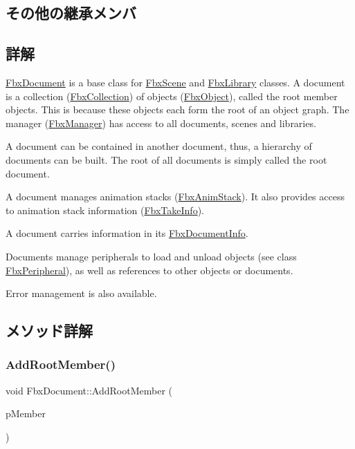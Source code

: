 \subsection*{その他の継承メンバ}


\subsection{詳解}
\hyperlink{class_fbx_document}{Fbx\+Document} is a base class for \hyperlink{class_fbx_scene}{Fbx\+Scene} and \hyperlink{class_fbx_library}{Fbx\+Library} classes. A document is a collection (\hyperlink{class_fbx_collection}{Fbx\+Collection}) of objects (\hyperlink{class_fbx_object}{Fbx\+Object}), called the root member objects. This is because these objects each form the root of an object graph. The manager (\hyperlink{class_fbx_manager}{Fbx\+Manager}) has access to all documents, scenes and libraries.

A document can be contained in another document, thus, a hierarchy of documents can be built. The root of all documents is simply called the root document.

A document manages animation stacks (\hyperlink{class_fbx_anim_stack}{Fbx\+Anim\+Stack}). It also provides access to animation stack information (\hyperlink{class_fbx_take_info}{Fbx\+Take\+Info}).

A document carries information in its \hyperlink{class_fbx_document_info}{Fbx\+Document\+Info}.

Documents manage peripherals to load and unload objects (see class \hyperlink{class_fbx_peripheral}{Fbx\+Peripheral}), as well as references to other objects or documents.

Error management is also available. 

\subsection{メソッド詳解}
\mbox{\label{class_fbx_document_a61a00187fc94a643db607720d336ffc8}} 
\subsubsection{\texorpdfstring{Add\+Root\+Member()}{AddRootMember()}}
{\footnotesize\ttfamily void Fbx\+Document\+::\+Add\+Root\+Member (\begin{DoxyParamCaption}\item[{\hyperlink{class_fbx_object}{Fbx\+Object} $\ast$}]{p\+Member }\end{DoxyParamCaption})}

